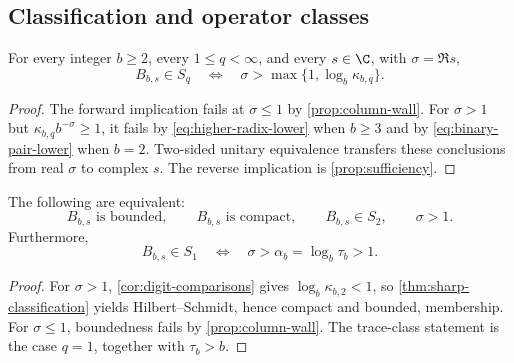 \subsection{Classification and operator classes}

\begin{theorem}
\label{thm:sharp-classification}
For every integer \(b\ge2\), every \(1\le q<\infty\), and every
\(s\in\C\), with \(\sigma=\Re s\),
\[
  B_{b,s}\in S_q
  \quad\Longleftrightarrow\quad
  \sigma>\max\{1,\log_b\kappa_{b,q}\}.
\]
\end{theorem}

\begin{proof}
The forward implication fails at \(\sigma\le1\) by
\cref{prop:column-wall}.  For \(\sigma>1\) but
\(\kappa_{b,q}b^{-\sigma}\ge1\), it fails by
\cref{eq:higher-radix-lower} when \(b\ge3\) and by
\cref{eq:binary-pair-lower} when \(b=2\).  Two-sided unitary equivalence
transfers these conclusions from real \(\sigma\) to complex \(s\).
The reverse implication is \cref{prop:sufficiency}.
\end{proof}

\begin{corollary}
\label{cor:operator-classes}
The following are equivalent:
\[
  B_{b,s}\text{ is bounded},\qquad
  B_{b,s}\text{ is compact},\qquad
  B_{b,s}\in S_2,\qquad
  \sigma>1.
\]
Furthermore,
\[
  B_{b,s}\in S_1
  \quad\Longleftrightarrow\quad
  \sigma>\alpha_b=\log_b\tau_b>1.
\]
\end{corollary}

\begin{proof}
For \(\sigma>1\), \cref{cor:digit-comparisons} gives
\(\log_b\kappa_{b,2}<1\), so \cref{thm:sharp-classification} yields
Hilbert--Schmidt, hence compact and bounded, membership.  For
\(\sigma\le1\), boundedness fails by \cref{prop:column-wall}.  The
trace-class statement is the case \(q=1\), together with
\(\tau_b>b\).
\end{proof}
